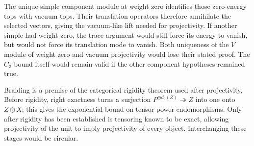 The unique simple component module at weight zero identifies those
zero-energy tops with vacuum tops. Their translation operators
therefore annihilate the selected vectors, giving the vacuum-like
lift needed for projectivity. If another simple had weight zero,
the trace argument would still force its energy to vanish, but
would not force its translation mode to vanish. Both uniqueness
of the $V$ module of weight zero and vacuum projectivity would
lose their stated proof. The $C_2$ bound itself would remain valid
if the other component hypotheses remained true.

Braiding is a premise of the categorical rigidity theorem used after
projectivity. Before rigidity, right exactness turns a surjection
$P^{\oplus d_0(Z)}\twoheadrightarrow Z$ into one onto $Z\otimes X$;
this gives the exponential bound on tensor-power endomorphisms.
Only after rigidity has been established is tensoring known to be
exact, allowing projectivity of the unit to imply projectivity of
every object. Interchanging these stages would be circular.


